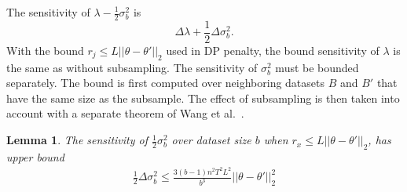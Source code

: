 \documentclass[english,twoside,openright]{HYgraduMLDS}
\newtheorem{lemma}{Lemma}[chapter]
\begin{document}
The sensitivity of \(\lambda - \frac{1}{2}\sigma_b^2\) is 
\[
    \Delta \lambda + \frac{1}{2}\Delta \sigma_b^2.
\]
With the bound \(r_j \leq L||\theta - \theta'||_2\) used in DP penalty, the 
bound sensitivity of \(\lambda\) is the same as without subsampling.
The sensitivity of \(\sigma_b^2\) must be bounded separately.
The bound is first computed over neighboring datasets \(B\) and \(B'\)
that have the same size as the subsample. The effect of subsampling is then
taken into account with a separate theorem of Wang et al.~\cite{WangBK19}.
\begin{lemma}\label{variance_sensitivity_lemma}
    The sensitivity of \(\frac{1}{2}\sigma_b^2\) over dataset size \(b\)
    when \(r_x \leq L||\theta - \theta'||_2\), has upper bound
    \begin{align*}
      \frac{1}{2}\Delta \sigma_b^2
      \leq \frac{3(b - 1)n^{2}T^{2}L^{2}}{b^{3}} ||\theta - \theta'||_{2}^{2}
    \end{align*}
\end{lemma}
\end{document}
